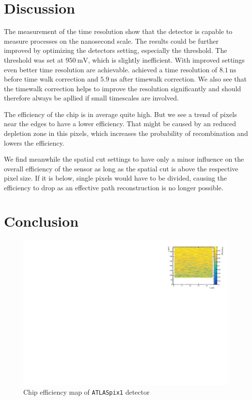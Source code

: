 \documentclass[twocolumn,DIV=14,a4paper,biblatex, 10pt]{scrartcl}
\newcommand{\atlaspix}{\texttt{ATLASpix1}\xspace}
\begin{document}
\section{Discussion}

The measurement of the time resolution show that the detector is capable to  measure processes on the nanosecond scale. The results could be further improved by optimizing the detectors setting, especially the threshold. The threshold was set at $\SI{950}{\milli\volt}$, which is slightly inefficient. With improved settings even better time resolution are achievable. \cite{} achieved a time resolution of $\SI{8.1}{\nano\second}$ before time walk correction and $\SI{5.9}{\nano\second}$ after timewalk correction. We also see that the timewalk correction helps to improve the resolution significantly and should therefore always be apllied if small timescales are involved.

The efficiency of the chip is in average quite high. But we see a trend of pixels near the edges to have a lower efficiency. That might be caused by an reduced depletion zone in this pixels, which increases the probability of recombination and lowers the efficiency.

We find meanwhile the spatial cut settings to have only a minor influence on the overall efficiency of the sensor as long as the spatial cut is above the respective pixel size. If it is below, single pixels would have to be divided, causing the efficiency to drop as an effective path reconstruction is no longer possible.
\section{Conclusion}

\begin{figure}
  \begin{center}
    \includegraphics{chip_efficiency}
  \end{center}
  \caption{Chip efficiency map of \atlaspix detector\label{fig:chip_eff}}
\end{figure}
\end{document}
